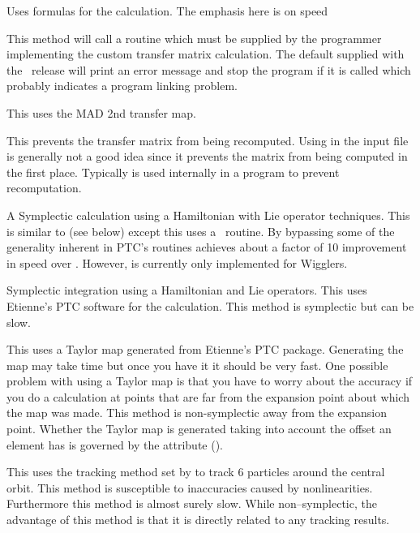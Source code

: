\begin{description}

\item[\vn{Bmad_Standard}]
Uses formulas for the calculation. The emphasis here is on speed

\item[\vn{Custom}]
This method will call a routine  which must be
supplied by the programmer implementing the custom transfer matrix
calculation. The default  supplied with the
\bmad\ release will print an error message and stop the program if it
is called which probably indicates a program linking problem.

\item[\vn{MAD}]
This uses the MAD 2nd transfer map.

\item[\vn{None}]
This prevents the transfer matrix from being recomputed.
Using  in the input file is generally not a good idea since
it prevents the matrix from being computed in the first place.
Typically  is used internally in a program to prevent recomputation.

\item[\vn{Symp_Lie_Bmad}]
A Symplectic calculation using a Hamiltonian with Lie operator techniques.
This is similar to  (see below) except this uses a
\bmad\ routine. By bypassing some of the generality inherent in PTC's routines
 achieves about a factor of 10 improvement in speed over
. However,  is
currently only implemented for Wigglers.

\item[\vn{Symp_Lie_PTC}]
Symplectic integration using a Hamiltonian and Lie operators.
This uses Etienne's PTC software for the calculation.
This method is symplectic but can be slow.

\item[\vn{Taylor}]
This uses a Taylor map generated from Etienne's PTC
package. Generating the map may take time but once you have it it
should be very fast. One possible problem with using a Taylor map is
that you have to worry about the accuracy if you do a calculation at
points that are far from the expansion point about which the map was
made. This method is non-symplectic away from the expansion
point. Whether the Taylor map is generated taking into account the
offset an element has is governed by the 
attribute ().

\item[\vn{Tracking}]
This uses the tracking method set by  to track 6
particles around the central orbit. This method is susceptible to inaccuracies
caused by nonlinearities. Furthermore this method
is almost surely slow. While non--symplectic, the advantage of this method
is that it is directly related to any tracking results.

\end{description}

